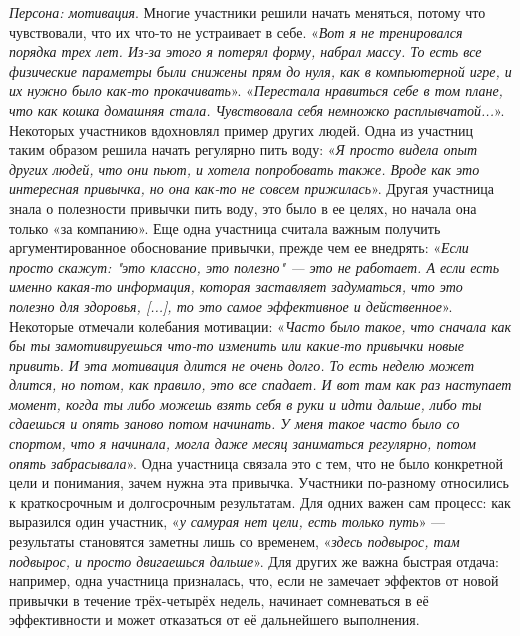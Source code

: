 \documentclass[pdflatex,sn-mathphys-num]{sn-jnl}%
\theoremstyle{thmstyleone}%
\theoremstyle{thmstyletwo}%
\theoremstyle{thmstylethree}%
\begin{document}
\textit{Персона: мотивация}. Многие участники решили начать меняться, потому что чувствовали, что их что-то не устраивает в себе. «\textit{Вот я не тренировался порядка трех лет. Из-за этого я потерял форму, набрал массу. То есть все физические параметры были снижены прям до нуля, как в компьютерной игре, и их нужно было как-то прокачивать}». «\textit{Перестала нравиться себе в том плане, что как кошка домашняя стала. Чувствовала себя немножко расплывчатой...}». Некоторых участников вдохновлял пример других людей. Одна из участниц таким образом решила начать регулярно пить воду: «\textit{Я просто видела опыт других людей, что они пьют, и хотела попробовать также. Вроде как это интересная привычка, но она как-то не совсем прижилась}». Другая участница знала о полезности привычки пить воду, это было в ее целях, но начала она только «за компанию». Еще одна участница считала важным получить аргументированное обоснование привычки, прежде чем ее внедрять: «\textit{Если просто скажут: "это классно, это полезно" — это не работает. А если есть именно какая-то информация, которая заставляет задуматься, что это полезно для здоровья, [...], то это самое эффективное и действенное}». Некоторые отмечали колебания мотивации: «\textit{Часто было такое, что сначала как бы ты замотивируешься что-то изменить или какие-то привычки новые привить. И эта мотивация длится не очень долго. То есть неделю может длится, но потом, как правило, это все спадает. И вот там как раз наступает момент, когда ты либо можешь взять себя в руки и идти дальше, либо ты сдаешься и опять заново потом начинать. У меня такое часто было со спортом, что я начинала, могла даже месяц заниматься регулярно, потом опять забрасывала}». Одна участница связала это с тем, что не было конкретной цели и понимания, зачем нужна эта привычка. Участники по-разному относились к краткосрочным и долгосрочным результатам. Для одних важен сам процесс: как выразился один участник, «\textit{у самурая нет цели, есть только путь}» — результаты становятся заметны лишь со временем, «\textit{здесь подвырос, там подвырос, и просто двигаешься дальше}». Для других же важна быстрая отдача: например, одна участница призналась, что, если не замечает эффектов от новой привычки в течение трёх-четырёх недель, начинает сомневаться в её эффективности и может отказаться от её дальнейшего выполнения.
\end{document}
